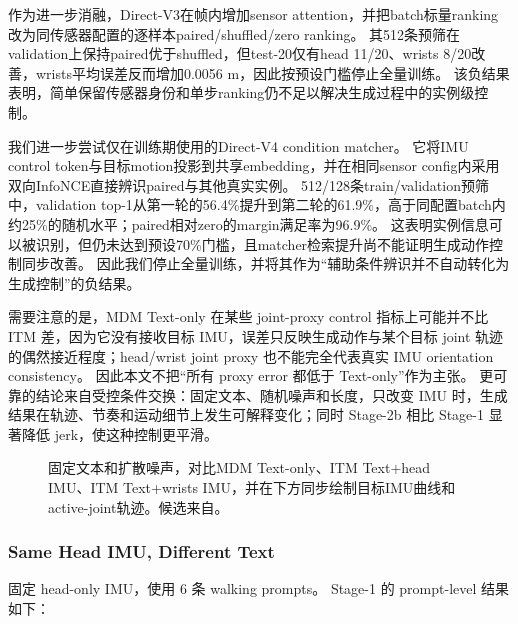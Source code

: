 作为进一步消融，Direct-V3在帧内增加sensor attention，并把batch标量ranking改为同传感器配置的逐样本paired/shuffled/zero ranking。
其512条预筛在validation上保持paired优于shuffled，但test-20仅有head 11/20、wrists 8/20改善，wrists平均误差反而增加0.0056 m，因此按预设门槛停止全量训练。
该负结果表明，简单保留传感器身份和单步ranking仍不足以解决生成过程中的实例级控制。

我们进一步尝试仅在训练期使用的Direct-V4 condition matcher。
它将IMU control token与目标motion投影到共享embedding，并在相同sensor config内采用双向InfoNCE直接辨识paired与其他真实实例。
512/128条train/validation预筛中，validation top-1从第一轮的56.4\%提升到第二轮的61.9\%，高于同配置batch内约25\%的随机水平；paired相对zero的margin满足率为96.9\%。
这表明实例信息可以被识别，但仍未达到预设70\%门槛，且matcher检索提升尚不能证明生成动作控制同步改善。
因此我们停止全量训练，并将其作为“辅助条件辨识并不自动转化为生成控制”的负结果。

需要注意的是，MDM Text-only 在某些 joint-proxy control 指标上可能并不比 ITM 差，因为它没有接收目标 IMU，误差只反映生成动作与某个目标 joint 轨迹的偶然接近程度；head/wrist joint proxy 也不能完全代表真实 IMU orientation consistency。
因此本文不把“所有 proxy error 都低于 Text-only”作为主张。
更可靠的结论来自受控条件交换：固定文本、随机噪声和长度，只改变 IMU 时，生成结果在轨迹、节奏和运动细节上发生可解释变化；同时 Stage-2b 相比 Stage-1 显著降低 jerk，使这种控制更平滑。

\begin{figure}[t]
\centering
{}
\caption{固定文本\texttt{\protect{}}和扩散噪声，对比MDM Text-only、ITM Text+head IMU、ITM Text+wrists IMU，并在下方同步绘制目标IMU曲线和active-joint轨迹。候选来自\texttt{\protect{}}。}
\label{fig:qualitative-1}
\end{figure}

\subsubsection{Same Head IMU, Different Text}

固定 head-only IMU，使用 6 条 walking prompts。
Stage-1 的 prompt-level 结果如下：


